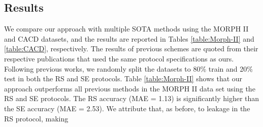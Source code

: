 \documentclass[10pt,journal]{IEEEtran}\usepackage{amsfonts}
\begin{document}
\subsection{Results}

\label{subsec:results}

We compare our approach with multiple SOTA methods using the MORPH II
\cite{1613043} and CACD \cite{chen14cross} datasets, and the results are
reported in Tables \ref{table:Morph-II} and \ref{table:CACD}, respectively.
The results of previous schemes are quoted from their respective publications
that used the same protocol specifications as ours. Following previous works,
we randomly split the datasets to 80\% train and 20\% test in both the RS and
SE protocols. Table \ref{table:Morph-II} shows that our approach outperforms
all previous methods in the MORPH II data set using the RS and SE protocols.
The RS accuracy (MAE = 1.13) is significantly higher than the SE accuracy (MAE
= 2.53). We attribute that, as before, to leakage in the RS protocol, making
\end{document}
